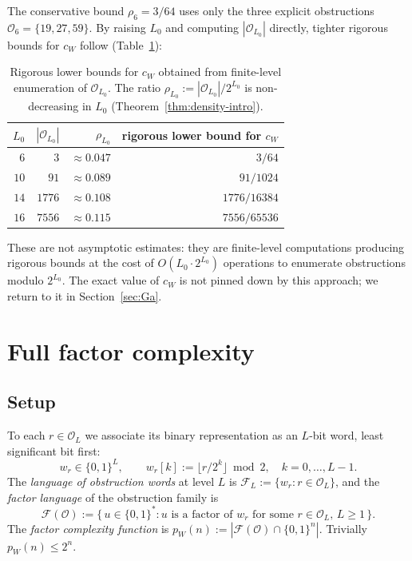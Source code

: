 \documentclass[11pt,reqno]{amsart}
\theoremstyle{plain}
\theoremstyle{definition}
\theoremstyle{remark}
\newcommand{\Obs}{\mathcal{O}}
\newcommand{\Fac}{\mathcal{F}}
\begin{document}
The conservative bound $\rho_6 = 3/64$ uses only the three explicit
obstructions $\Obs_6 = \{19, 27, 59\}$. By raising $L_0$ and computing
$|\Obs_{L_0}|$ directly, tighter rigorous bounds for $c_W$ follow
(Table~\ref{tab:density-bounds}):

\begin{table}[h]
\centering
\begin{tabular}{rrrr}
\toprule
$L_0$ & $|\Obs_{L_0}|$ & $\rho_{L_0}$ & rigorous lower bound for $c_W$ \\
\midrule
$6$  & $3$    & $\approx 0.047$ & $3/64$ \\
$10$ & $91$   & $\approx 0.089$ & $91/1024$ \\
$14$ & $1776$ & $\approx 0.108$ & $1776/16384$ \\
$16$ & $7556$ & $\approx 0.115$ & $7556/65536$ \\
\bottomrule
\end{tabular}
\caption{Rigorous lower bounds for $c_W$ obtained from finite-level enumeration of $\Obs_{L_0}$. The ratio $\rho_{L_0} := |\Obs_{L_0}|/2^{L_0}$ is non-decreasing in $L_0$ (Theorem~\ref{thm:density-intro}).}
\label{tab:density-bounds}
\end{table}

These are not asymptotic estimates: they are finite-level computations
producing rigorous bounds at the cost of $O(L_0 \cdot 2^{L_0})$ operations
to enumerate obstructions modulo $2^{L_0}$. The exact value of $c_W$ is
not pinned down by this approach; we return to it in
Section~\ref{sec:Ga}.

\section{Full factor complexity}
\label{sec:fc}

\subsection{Setup}

To each $r \in \Obs_L$ we associate its binary representation as an
$L$-bit word, least significant bit first:
\[
w_r \in \{0,1\}^L, \qquad w_r[k] := \lfloor r / 2^k \rfloor \bmod 2, \quad k = 0, \ldots, L-1.
\]
The \emph{language of obstruction words} at level $L$ is
$\Fac_L := \{w_r : r \in \Obs_L\}$, and the \emph{factor language} of the
obstruction family is
\[
\Fac(\Obs) := \{\, u \in \{0,1\}^* : u \text{ is a factor of } w_r \text{ for some } r \in \Obs_L,\, L \ge 1 \,\}.
\]
The \emph{factor complexity function} is
$p_W(n) := |\Fac(\Obs) \cap \{0,1\}^n|$. Trivially $p_W(n) \le 2^n$.
\end{document}
